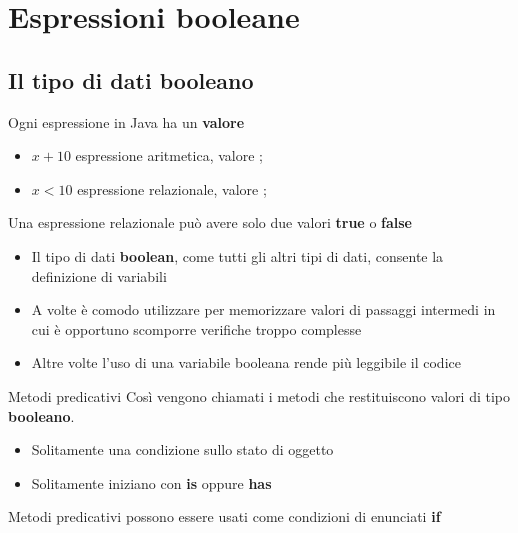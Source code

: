 \section*{Espressioni booleane}
\begin{frame}
\begin{huge}
\begin{center}
\textbf{}
\end{center}
\end{huge}
\end{frame}

\subsection*{Il tipo di dati booleano}
\begin{frame}
\begin{block}{}
Ogni espressione in Java ha un \textbf{valore}
\begin{itemize}
\item \textbf{$x + 10 $} espressione aritmetica, valore ;
\item \textbf{$x < 10 $} espressione relazionale, valore ;
\end{itemize}
Una espressione relazionale può avere solo due valori \textbf{\alert{true}} o \textbf{\alert{false}}
\end{block}
\end{frame}

\begin{frame}
\begin{block}{}
\begin{itemize}
\item Il tipo di dati \textbf{boolean}, come tutti gli altri tipi di dati, consente la definizione di variabili
\item A volte è comodo utilizzare \textbf{} per memorizzare valori di passaggi intermedi in cui è opportuno
scomporre verifiche troppo complesse
\item Altre volte l'uso di una variabile booleana rende più leggibile il codice
\end{itemize}
\end{block}
\begin{block}{Metodi predicativi}
Così vengono chiamati i metodi che restituiscono valori di tipo \textbf{booleano}.
\begin{itemize}
\item Solitamente \textbf{} una condizione sullo stato di oggetto
\item Solitamente iniziano con \textbf{is} oppure \textbf{has}
\end{itemize}
Metodi predicativi possono essere usati come condizioni di enunciati \textbf{if}
\end{block}
\end{frame}

